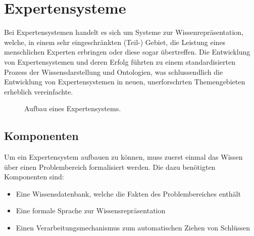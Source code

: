 \chapter{Expertensysteme}
\label{chap:experten_systeme}

Bei Expertensystemen handelt es sich um Systeme zur Wissenrepräsentation, welche, in einem sehr eingeschränkten (Teil-) Gebiet, die Leistung eines menschlichen Experten erbringen oder diese sogar übertreffen. Die Entwicklung von Expertensystemen und deren Erfolg führten zu einem standardisierten Prozess der Wissensdarstellung und Ontologien, was schlussendlich die Entwicklung von Expertensystemen in neuen, unerforschrten Themengebieten erheblich vereinfachte.~\cite[S. 257]{russel}

\begin{figure}[htbp]
\centering {}
\caption{Aufbau eines Expertensystems.\label{fig:aufbau_expertensysteme}\protect\footnotemark}
\end{figure}

\section{Komponenten}
\label{sec:experten_systeme_komponenten}
Um ein Expertensystem aufbauen zu können, muss zuerst einmal das Wissen über einen Problembereich formalisiert werden. Die dazu benötigten Komponenten sind:
\begin{itemize}
    \item Eine Wissensdatenbank, welche die Fakten des Problembereiches enthält
    \item Eine formale Sprache zur Wissensrepräsentation
    \item Einen Verarbeitungsmechanismus zum automatischen Ziehen von Schlüssen
\end{itemize}

